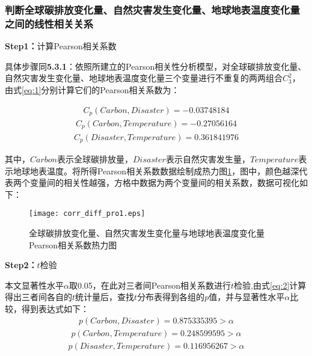 \documentclass[withoutpreface,bwprint]{cumcmthesis}
\begin{document}
	
	\subsubsection{判断全球碳排放变化量、自然灾害发生变化量、地球地表温度变化量之间的线性相关关系}
	
	\textbf{Step1：}计算Pearson相关系数
	
	具体步骤同\textbf{5.3.1}：依照所建立的Pearson相关性分析模型，对全球碳排放变化量、自然灾害发生变化量、地球地表温度变化量三个变量进行不重复的两两组合$C_3^2$，由式\eqref{eq:1}分别计算它们的Pearson相关系数为：
	
\begin{align*}
	{{C}_{p}}(Carbon,Disaster)=-0.03748184
\end{align*}
\begin{align*}
	{{C}_{p}}(Carbon,Temperature)=-0.27056164
\end{align*}
\begin{align*}
	{{C}_{p}}(Disaster,Temperature)=0.361841976
\end{align*}
	
	其中，$Carbon$表示全球碳排放量，$Disaster$表示自然灾害发生量，$Temperature$表示地球地表温度。将所得Pearson相关系数数据绘制成热力图\ref{fig:corrdiffpro1}，图中，颜色越深代表两个变量间的相关性越强，方格中数据为两个变量间的相关系数，数据可视化如下：
	
\begin{figure}[htbp]
	\centering
	\texttt{[image: corr\_diff\_pro1.eps]}
	\caption{全球碳排放变化量、自然灾害发生变化量与地球地表温度变化量Pearson相关系数热力图}
	\label{fig:corrdiffpro1}
\end{figure}





	\textbf{Step2：}$t$检验
	
本文显著性水平$\alpha$取0.05，在此对三者间Pearson相关系数进行$t$检验,由式\eqref{eq:2}计算得出三者间各自的$t$统计量后，查找$t$分布表得到各组的$p$值，并与显著性水平$\alpha $比较，得到表达式如下：
	\begin{align*}
		p(Carbon,Disaster)=0.875335395>\alpha
	\end{align*}
	\begin{align*}
		p(Carbon,Temperature)=0.248599595>\alpha
	\end{align*}
	\begin{align*}
		p(Disaster,Temperature)=0.116956267>\alpha
	\end{align*}
	
\end{document}
